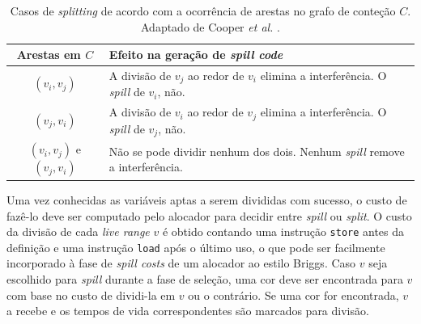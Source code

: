 \documentclass[
	12pt,				%
	openright,			%
	twoside,			%
	a4paper,			%
	tcc,			%
	]{ABNT-DC-UEL}
\begin{document}
\begin{table}[hb]
    \centering
    \begin{tabular}{cp{7cm}}
        \hline
        \textbf{Arestas em $C$} & \textbf{Efeito na geração de \textit{spill code}}\\\hline\hline
        $(v_i,v_j)$ & A divisão de $v_j$ ao redor de $v_i$ elimina a interferência. O \textit{spill} de $v_i$, não.\\\hline
        $(v_j,v_i)$ & A divisão de $v_i$ ao redor de $v_j$ elimina a interferência. O \textit{spill} de $v_j$, não.\\\hline
        $(v_i,v_j)$ e $(v_j,v_i)$ & Não se pode dividir nenhum dos dois. Nenhum \textit{spill} remove a interferência.\\\hline
    \end{tabular}
    \caption{Casos de \textit{splitting} de acordo com a ocorrência de arestas no grafo de conteção $C$. Adaptado de Cooper \textit{et al.} \cite{cooper:98}.}
    \label{tab:splitting-1}
\end{table}

Uma vez conhecidas as variáveis aptas a serem divididas com sucesso, o custo de fazê-lo deve ser computado pelo alocador para decidir entre \textit{spill} ou \textit{split}. O custo da divisão de cada \textit{live range} $v$ é obtido contando uma instrução \texttt{store} antes da definição e uma instrução \texttt{load} após o último uso, o que pode ser facilmente incorporado à fase de \textit{spill costs} de um alocador ao estilo Briggs. Caso $v$ seja escolhido para \textit{spill} durante a fase de seleção, uma cor deve ser encontrada para $v$ com base no custo de dividi-la em $v$ ou o contrário. Se uma cor for encontrada, $v$ a recebe e os tempos de vida correspondentes são marcados para divisão.
\end{document}

